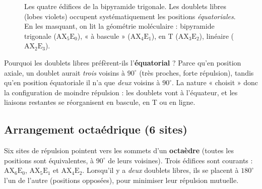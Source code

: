 \documentclass[11pt,a4paper]{article}
\newcommand{\AX}[2]{\ensuremath{\mathrm{AX_{#1}E_{#2}}}}
\newcommand{\ball}[5]{\shade[ball color=#2] (#1) circle (#3);%
  \node[font=\footnotesize\bfseries,text=#4] at (#1){#5};}
\newcommand{\pbond}[2]{\draw[bondcol,line width=1.6pt] (#1)--(#2);}
\newcommand{\lobe}[3]{\begin{scope}[shift={(#1)},rotate=#2]
  \shade[ball color=lonepair!55,opacity=0.9] (#3,0) ellipse (0.34 and 0.20);
  \end{scope}}
\begin{document}
\begin{figure}[h]
\caption{Les quatre édifices de la bipyramide trigonale. Les doublets libres (lobes violets)
occupent systématiquement les positions \emph{équatoriales}. En les masquant, on lit la géométrie
moléculaire :  bipyramide trigonale (\AX{5}{0}),  « à bascule » (\AX{4}{1}),
 en T (\AX{3}{2}),  linéaire (\AX{2}{3}).}
\label{fig:bipyramide}
\end{figure}

\begin{remarque}
Pourquoi les doublets libres préfèrent-ils l'\textbf{équatorial} ? Parce qu'en position axiale, un
doublet aurait \emph{trois} voisins à $90^\circ$ (très proches, forte répulsion), tandis qu'en
position équatoriale il n'a que \emph{deux} voisins à $90^\circ$. La nature « choisit » donc la
configuration de moindre répulsion : les doublets vont à l'équateur, et les liaisons restantes se
réorganisent en bascule, en T ou en ligne.
\end{remarque}

\subsection{Arrangement octaédrique (6 sites)}

Six sites de répulsion pointent vers les sommets d'un \textbf{octaèdre} (toutes les positions
sont équivalentes, à $90^\circ$ de leurs voisines). Trois édifices sont courants : \AX{6}{0},
\AX{5}{1} et \AX{4}{2}. Lorsqu'il y a \emph{deux} doublets libres, ils se placent à $180^\circ$
l'un de l'autre (positions opposées), pour minimiser leur répulsion mutuelle.
\end{document}
